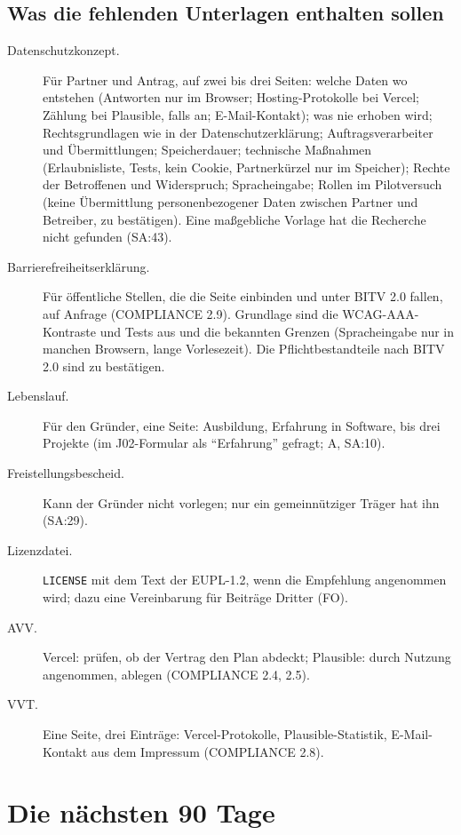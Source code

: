 \documentclass[10pt,parskip=half-]{scrartcl}
\begin{document}
\subsection{Was die fehlenden Unterlagen enthalten sollen}
\begin{description}
  \item[Datenschutzkonzept.] Für Partner und Antrag, auf zwei bis drei Seiten: welche Daten wo
    entstehen (Antworten nur im Browser; Hosting-Protokolle bei Vercel; Zählung bei Plausible,
    falls an; E-Mail-Kontakt); was nie erhoben wird; Rechtsgrundlagen wie in der
    Datenschutzerklärung; Auftragsverarbeiter und Übermittlungen; Speicherdauer; technische
    Maßnahmen (Erlaubnisliste, Tests, kein Cookie, Partnerkürzel nur im Speicher); Rechte der
    Betroffenen und Widerspruch; Spracheingabe; Rollen im Pilotversuch (keine Übermittlung
    personenbezogener Daten zwischen Partner und Betreiber, zu bestätigen). Eine maßgebliche
    Vorlage hat die Recherche nicht gefunden (SA:43).
  \item[Barrierefreiheitserklärung.] Für öffentliche Stellen, die die Seite einbinden und unter
    BITV 2.0 fallen, auf Anfrage (COMPLIANCE 2.9). Grundlage sind die WCAG-AAA-Kontraste und
    Tests aus  und die bekannten Grenzen (Spracheingabe nur in manchen
    Browsern, lange Vorlesezeit). Die Pflichtbestandteile nach BITV 2.0 sind zu bestätigen.
  \item[Lebenslauf.] Für den Gründer, eine Seite: Ausbildung, Erfahrung in Software, bis drei
    Projekte (im J02-Formular als \enquote{Erfahrung} gefragt; A, SA:10).
  \item[Freistellungsbescheid.] Kann der Gründer nicht vorlegen; nur ein gemeinnütziger Träger hat
    ihn (SA:29).
  \item[Lizenzdatei.] \texttt{LICENSE} mit dem Text der EUPL-1.2, wenn die Empfehlung angenommen
    wird; dazu eine Vereinbarung für Beiträge Dritter (FO).
  \item[AVV.] Vercel: prüfen, ob der Vertrag den Plan abdeckt; Plausible: durch Nutzung
    angenommen, ablegen (COMPLIANCE 2.4, 2.5).
  \item[VVT.] Eine Seite, drei Einträge: Vercel-Protokolle, Plausible-Statistik, E-Mail-Kontakt
    aus dem Impressum (COMPLIANCE 2.8).
\end{description}

\section{Die nächsten 90 Tage}
\end{document}
